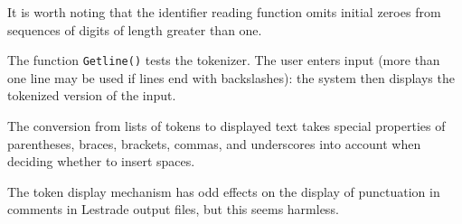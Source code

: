 \documentclass[12pt]{article}
\begin{document}
It is worth noting that the identifier reading function omits initial zeroes from sequences of digits of length greater than one.

The function {\tt Getline()} tests the tokenizer.  The user enters input (more than one line may be used if lines end with backslashes):  the system then displays the tokenized version
of the input.

The conversion from lists of tokens to displayed text takes special properties of parentheses, braces, brackets, commas, and underscores into account when deciding whether to insert spaces.

The token display mechanism has odd effects on the display of punctuation in comments in Lestrade output files, but this seems harmless.

\newpage
\end{document}
